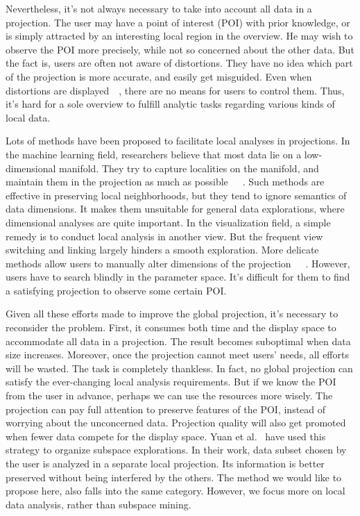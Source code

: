 Nevertheless, it's not always necessary to take into account all data in a projection. The user may have a point of interest (POI) with prior knowledge, or is simply attracted by an interesting local region in the overview. He may wish to observe the POI more precisely, while not so concerned about the other data. But the fact is, users are often not aware of distortions. They have no idea which part of the projection is more accurate, and easily get misguided. Even when distortions are displayed~\cite{DBLP:journals/ijon/Aupetit07}~\cite{DBLP:journals/cgf/LiuWBP14}, there are no means for users to control them. Thus, it's hard for a sole overview to fulfill analytic tasks regarding various kinds of local data.

Lots of methods have been proposed to facilitate local analyses in projections. In the machine learning field, researchers believe that most data lie on a low-dimensional manifold. They try to capture localities on the manifold, and maintain them in the projection as much as possible~\cite{DBLP:journals/neco/BelkinN03}~\cite{roweis2000nonlinear}~\cite{DBLP:journals/corr/cs-LG-0212008}. Such methods are effective in preserving local neighborhoods, but they tend to ignore semantics of data dimensions. It makes them unsuitable for general data explorations, where dimensional analyses are quite important. In the visualization field, a simple remedy is to conduct local analysis in another view. But the frequent view switching and linking largely hinders a smooth exploration. More delicate methods allow users to manually alter dimensions of the projection~\cite{DBLP:journals/cgf/JeongZFRC09}~\cite{DBLP:journals/tvcg/NamM13}~\cite{DBLP:journals/tvcg/LehmannT13}. However, users have to search blindly in the parameter space. It's difficult for them to find a satisfying projection to observe some certain POI.

Given all these efforts made to improve the global projection, it's necessary to reconsider the problem. First, it consumes both time and the display space to accommodate all data in a projection. The result becomes suboptimal when data size increases. Moreover, once the projection cannot meet users' needs, all efforts will be wasted. The task is completely thankless. In fact, no global projection can satisfy the ever-changing local analysis requirements. But if we know the POI from the user in advance, perhaps we can use the resources more wisely. The projection can pay full attention to preserve features of the POI, instead of worrying about the unconcerned data. Projection quality will also get promoted when fewer data compete for the display space. Yuan et al.~\cite{DBLP:journals/tvcg/YuanRWG13} have used this strategy to organize subspace explorations. In their work, data subset chosen by the user is analyzed in a separate local projection. Its information is better preserved without being interfered by the others. The method we would like to propose here, also falls into the same category. However, we focus more on local data analysis, rather than subspace mining.

